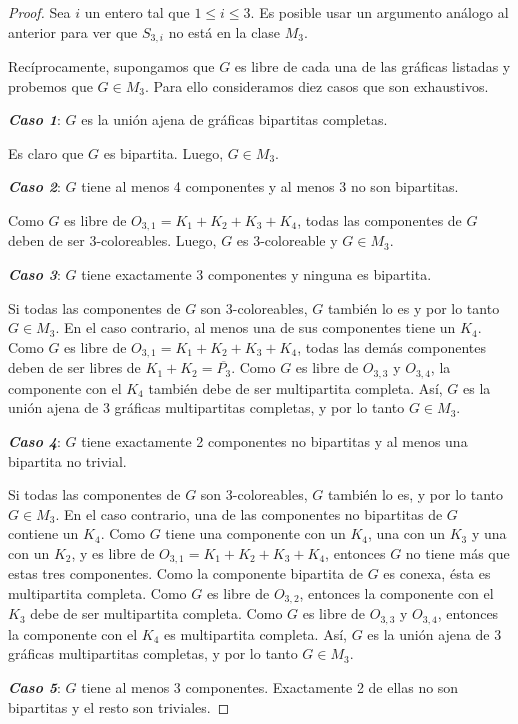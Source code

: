 \begin{proof}
Sea $i$ un entero tal que $1 \le i \le 3$.   Es posible usar un argumento an\'alogo al anterior para ver que $S_{3,i}$ no está en la clase $M_3$.

Recíprocamente, supongamos que $G$ es libre de cada una de las gráficas listadas y probemos que $G\in M_3$.  Para ello consideramos diez casos que son exhaustivos.

\emph{\textbf{Caso 1}}: $G$ es la unión ajena de gráficas bipartitas completas.

Es claro que $G$ es bipartita. Luego, $G\in M_3$.

\emph{\textbf{Caso 2}}: $G$ tiene al menos 4 componentes y al menos 3 no son bipartitas.

Como $G$ es libre de $O_{3,1}=K_1+K_2+K_3+K_4$, todas las componentes de $G$ deben de ser 3-coloreables. Luego, $G$ es 3-coloreable y $G\in M_3$.

\emph{\textbf{Caso 3}}: $G$ tiene exactamente 3 componentes y ninguna es bipartita.

Si todas las componentes de $G$ son 3-coloreables, $G$ también lo es y por lo tanto $G\in M_3$. En el caso contrario, al menos una de sus componentes tiene un $K_4$. Como $G$ es libre de $O_{3,1}=K_1+K_2+K_3+K_4$, todas las demás componentes deben de ser libres de $K_1+K_2=\overline{P_3}$. Como $G$ es libre de $O_{3,3}$ y $O_{3,4}$, la componente con el $K_4$ también debe de ser multipartita completa. Así, $G$ es la unión ajena de 3 gráficas multipartitas completas, y por lo tanto $G\in M_3$.

\emph{\textbf{Caso 4}}: $G$ tiene exactamente 2 componentes no bipartitas y al menos una bipartita no trivial.

Si todas las componentes de $G$ son 3-coloreables, $G$ también lo es, y por lo tanto $G\in M_3$. En el caso contrario, una de las componentes no bipartitas de $G$ contiene un $K_4$. Como $G$ tiene una componente con un $K_4$, una con un $K_3$ y una con un $K_2$, y es libre de $O_{3,1}=K_1+K_2+K_3+K_4$, entonces $G$ no tiene más que estas tres componentes. Como la componente bipartita de $G$ es conexa, ésta es multipartita completa. Como $G$ es libre de $O_{3,2}$, entonces la componente con el $K_3$ debe de ser multipartita completa. Como $G$ es libre de $O_{3,3}$ y $O_{3,4}$, entonces la componente con el $K_4$ es multipartita completa. Así, $G$ es la unión ajena de 3 gráficas multipartitas completas, y por lo tanto $G\in M_3$.

\emph{\textbf{Caso 5}}: $G$ tiene al menos 3 componentes. Exactamente 2 de ellas no son bipartitas y el resto son triviales.


\end{proof}
